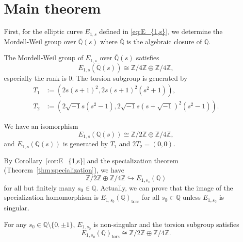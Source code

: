 \documentclass[main]{subfiles}
\begin{document}
\section{Main theorem}
First, for the elliptic curve $E_{1,s}$ defined in \eqref{eq:E_{1,s}}, we determine the Mordell-Weil group over $\overline{\mathbb{Q}}(s)$  where $\overline{\mathbb{Q}}$ is the algebraic closure of $\mathbb{Q}$.

\begin{thm}
    \label{thm:E_{1,s}}
    The Mordell-Weil group of $E_{1,s}$ over $\overline{\mathbb{Q}}(s)$ satisfies
    \begin{equation*}
        E_{1,s}(\overline{\mathbb{Q}}(s)) \cong \mathbb{Z} / 4 \mathbb{Z} \oplus \mathbb{Z} / 4 \mathbb{Z},
    \end{equation*}
    especially the rank is $0$. The torsion subgroup is generated by
    \begin{align*}
        T_1 & := (2s(s+1)^2, 2s(s+1)^2(s^2+1)),                               \\
        T_2 & := (2 \sqrt{-1} s(s^2-1),2 \sqrt{-1} s(s+\sqrt{-1})^2(s^2-1)).
    \end{align*}
\end{thm}

\begin{cor}
    \label{cor:E_{1,s}}
    We have an isomorphism
    \begin{equation*}
        E_{1,s}(\mathbb{Q}(s)) \cong \mathbb{Z} / 2 \mathbb{Z} \oplus \mathbb{Z} / 4 \mathbb{Z},
    \end{equation*}
    and $E_{1,s}(\mathbb{Q}(s))$ is generated by $T_1$ and $2T_2=(0,0)$.
\end{cor}

By Corollary~\ref{cor:E_{1,s}} and the specialization theorem (Theorem~\ref{thm:specialization}), we have
\begin{equation*}
    \mathbb{Z} / 2 \mathbb{Z} \oplus \mathbb{Z} / 4 \mathbb{Z} \hookrightarrow E_{1,s_{0}}(\mathbb{Q})
\end{equation*}
for all but finitely many $s_0 \in \mathbb{Q}$.
Actually, we can prove that the image of the specialization homomorphism is $E_{1,s_0}(\mathbb{Q})_{\text{tors}}$ for all $s_0 \in \mathbb{Q}$ unless $E_{1,s_0}$ is singular.

\begin{thm}
    \label{thm:E_{1,s_0}}
    For any $s_0 \in \mathbb{Q} \setminus \{0,\pm 1 \}$, $E_{1,s_0}$ is non-singular and the torsion subgroup satisfies
    \begin{equation*}
        E_{1,s_{0}}(\mathbb{Q})_{\text{tors}} \cong \mathbb{Z} / 2 \mathbb{Z} \oplus \mathbb{Z} / 4 \mathbb{Z}.
    \end{equation*}
\end{thm}
\end{document}
